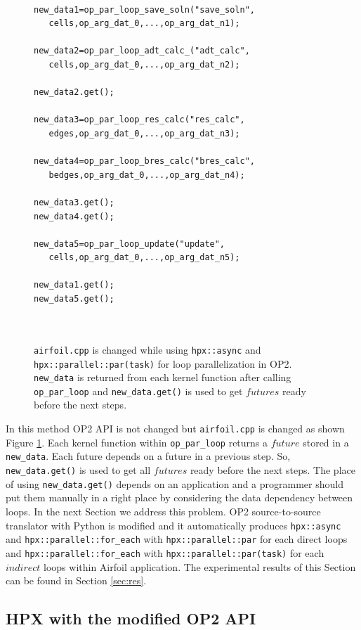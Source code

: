 \documentclass[conference]{IEEEtran}
\begin{document}
\begin{figure} [!h]
    \begin{lstlisting}   

new_data1=op_par_loop_save_soln("save_soln",
   cells,op_arg_dat_0,...,op_arg_dat_n1);
  
new_data2=op_par_loop_adt_calc_("adt_calc",
   cells,op_arg_dat_0,...,op_arg_dat_n2);
   
new_data2.get();  
   
new_data3=op_par_loop_res_calc("res_calc",
   edges,op_arg_dat_0,...,op_arg_dat_n3);
 
new_data4=op_par_loop_bres_calc("bres_calc",
   bedges,op_arg_dat_0,...,op_arg_dat_n4);
   
new_data3.get();
new_data4.get();
 
new_data5=op_par_loop_update("update",
   cells,op_arg_dat_0,...,op_arg_dat_n5);

new_data1.get();
new_data5.get();

    
    \end{lstlisting}
    \caption{\small{\texttt{airfoil.cpp} is changed while using \texttt{hpx::async} and \texttt{hpx::parallel::par(task)} for loop parallelization in OP2. \texttt{new\_data} is returned from each kernel function after calling \texttt{op\_par\_loop} and \texttt{new\_data.get()} is used to get $futures$ ready before the next steps.}}
    \label{l4}
\end{figure}


In this method OP2 API is not changed but \texttt{airfoil.cpp} is changed as shown Figure \ref{l4}. Each kernel function within \texttt{op\_par\_loop} returns a $future$ stored in a \texttt{new\_data}. Each future depends on a future in a previous step. So, \texttt{new\_data.get()} is used to get all $futures$ ready before the next steps. The place of using \texttt{new\_data.get()} depends on an application and a programmer should put them manually in a right place by considering the data dependency between loops. In the next Section we address this problem. OP2 source-to-source translator with Python is modified and it automatically produces \texttt{hpx::async} and \texttt{hpx::parallel::for\_each} with \texttt{hpx::parallel::par} for each direct loops and \texttt{hpx::parallel::for\_each} with \texttt{hpx::parallel::par(task)} for each $indirect$ loops within Airfoil application. The experimental results of this Section can be found in Section \ref{sec:res}.



\subsection{\textbf{HPX with the modified OP2 API}}
\label{sec:with}
\end{document}
